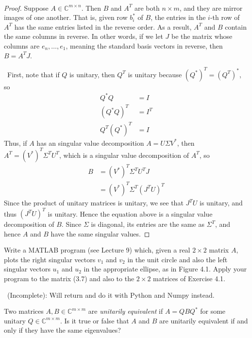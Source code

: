 \documentclass[12pt]{article}
\newenvironment{ex}[2][Exercise]{\begin{trivlist}
		\item[\hskip \labelsep {\bfseries #1}\hskip \labelsep {\bfseries #2.}]}{\end{trivlist}}
\newenvironment{sol}[1][Solution]{\begin{trivlist}
		\item[\hskip \labelsep {\bfseries #1:}]}{\end{trivlist}}
\begin{document}
\begin{sol}
	\
	\begin{proof}
		Suppose $A\in\mathbb{C}^{m\times n}$. Then $B$ and $A^T$ are both $n\times m$, and they
		are mirror images of one another. That is, given row $b_i^*$ of $B$, the entries in the $i$-th row
		of $A^T$ has the same entries listed in the reverse order. As a result, $A^T$ and $B$ contain
		the same columns in reverse. In other words, if we let $J$ be the matrix whose columns are
		$e_n,\ldots,e_1$, meaning the standard basis vectors in reverse, then $B=A^TJ$.
		
		\
		First, note that if $Q$ is unitary, then $Q^T$ is unitary because $(Q^*)^T=(Q^T)^*$, so
		\begin{align*}
			Q^*Q&=I\\
			(Q^*Q)^T&=I^T\\
			Q^T(Q^*)^T&=I
		\end{align*}
		Thus, if $A$ has an singular value decomposition $A=U\Sigma V^*$, then $A^T=(V^*)^T\Sigma^TU^T$, which is a singular value decomposition of
		$A^T$, so
		\begin{align*}
			B &= (V^*)^T\Sigma^T U^TJ\\
			&=(V^*)^T\Sigma^T (J^TU)^T
		\end{align*}
		Since the product of unitary matrices is unitary, we see that $J^TU$ is unitary, and thus
		$(J^TU)^T$ is unitary. Hence the equation above is a singular value decomposition of $B$.
		Since $\Sigma$ is diagonal, its entries are the same as $\Sigma^T$, and hence $A$ and $B$ have
		the same singular values.
	\end{proof}
\end{sol}

\begin{ex}{4.3}
	Write a MATLAB program (see Lecture 9) which, given a real $2\times 2$ matrix $A$, plots the right
	singular vectors $v_1$ and $v_2$ in the unit circle and also the left singular vectors $u_1$ and
	$u_2$ in the appropriate ellipse, as in Figure 4.1. Apply your program to the matrix (3.7) and
	also to the $2\times 2$ matrices of Exercise 4.1.
\end{ex}

\begin{sol}
	\
	(Incomplete): Will return and do it with Python and Numpy instead.
\end{sol}

\begin{ex}{4.4}
	Two matrices $A,B\in\mathbb{C}^{m\times m}$ are \emph{unitarily equivalent} if $A=QBQ^*$ for
	some unitary $Q\in\mathbb{C}^{m\times m}$. Is it true or false that $A$ and $B$ are unitarily
	equivalent if and only if they have the same eigenvalues?
\end{ex}
\end{document}

